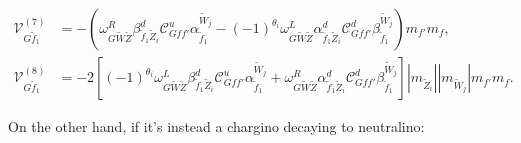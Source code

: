 \documentclass[final,3p,times,pdflatex]{elsarticle}
\begin{document}
\begin{align}
\mathcal{V}_{G \tilde{f}_1}^{(7)} &= -(\omega_{G \tilde{W} \tilde{Z}}^R \beta_{\tilde{f}_1 \tilde{Z}_i}^{d} \mathcal{C}_{G f f'}^u \alpha_{\tilde{f}_1}^{\tilde{W}_j} - (-1)^{\theta_i}\omega_{G \tilde{W} \tilde{Z}}^L \alpha_{\tilde{f}_1 \tilde{Z}_i}^{d} \mathcal{C}_{G f f'}^d \beta_{\tilde{f}_1}^{\tilde{W}_j})m_{f'}m_{f}, \\
\mathcal{V}_{G \tilde{f}_1}^{(8)} &= -2[(-1)^{\theta_i}\omega_{G \tilde{W} \tilde{Z}}^L \beta_{\tilde{f}_1 \tilde{Z}_i}^{d} \mathcal{C}_{G f f'}^u \alpha_{\tilde{f}_1}^{\tilde{W}_j} + \omega_{G \tilde{W} \tilde{Z}}^R \alpha_{\tilde{f}_1 \tilde{Z}_i}^{d} \mathcal{C}_{G f f'}^d \beta_{\tilde{f}_1}^{\tilde{W}_j}]|m_{\tilde{Z}_i}||m_{\tilde{W}_j}|m_{f'}m_{f}.
\end{align}

On the other hand, if it's instead a chargino decaying to neutralino:
\end{document}
